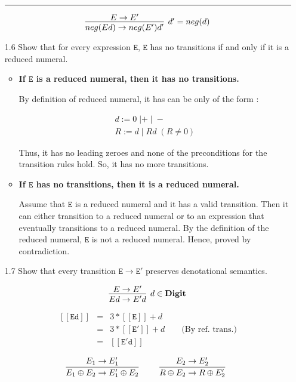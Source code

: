 \documentclass[a4paper,10pt]{article}
\newcommand{\E}{\mathtt{E}}
\newcommand{\Digit}{\mathbf{Digit}}
\newcommand{\denot}[1]{\mathtt{[[{#1}]]}}
\newcommand{\question}[1]
{\color{DarkBlue}#1 \color{Black} \newline}
\begin{document}
\begin{enumerate}
\hrule

\[
\infer[d' = neg(d)] 
  {neg(Ed) \rightarrow neg(E')d'}  
  {E \rightarrow E'}    
\]

\question{
\item[1.6] Show that for every expression $\E$, $\E$ has no transitions if and 
only if it is a reduced numeral.
}

\begin{itemize}

	\item {\textbf{If $\E$ is a reduced numeral, then it has no transitions.}}
	
	By definition of reduced numeral, it has can be only of the form :

	\begin{gather*}
	d := 0 \; | + \; | \; - \\
	R := d \; | \; Rd \; (R \neq 0)
	\end{gather*}
	
	Thus, it has no leading zeroes and none of the preconditions for the
	transition rules hold. So, it has no more transitions.
	
	\item {\textbf{If $\E$ has no transitions, then it is a reduced numeral.}}
	
	Assume that $\E$ is a reduced numeral and it has a valid transition.
	Then it can either transition to a reduced numeral or to an expression 
	that eventually transitions to a reduced numeral. By the definition of
	the reduced numeral, $\E$ is not a reduced numeral. Hence, proved
	by contradiction.

\end{itemize}

\question{
\item[1.7] Show that every transition $\E \to \E'$ preserves denotational semantics.
}

\[
\infer[d \in \Digit]
  {Ed \rightarrow E'd}
  {E \rightarrow E'}
\]

\proof
\begin{eqnarray*}
\denot{Ed}  
            & = &  3 * \denot{E} + d  \\
            & = &  3 * \denot{E'} + d \qquad \text{(By ref. trans.)} \\ 
            & = & \denot{E'd} 
\end{eqnarray*}

\[
\infer[]
  {E_{1} \oplus E_{2} \rightarrow E_{1}' \oplus E_{2}}
  {E_{1} \rightarrow E_{1}'} \qquad
\infer[]
  {R \oplus E_{2} \rightarrow R \oplus E_{2}'}
  {E_{2} \rightarrow E_{2}'}
\]


\end{enumerate}
\end{document}
